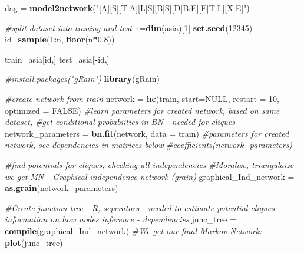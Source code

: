 \documentclass[]{article}
\newenvironment{Shaded}{\begin{snugshade}}{\end{snugshade}}
\newcommand{\CommentTok}[1]{\textcolor[rgb]{0.56,0.35,0.01}{\textit{#1}}}
\newcommand{\DataTypeTok}[1]{\textcolor[rgb]{0.13,0.29,0.53}{#1}}
\newcommand{\DecValTok}[1]{\textcolor[rgb]{0.00,0.00,0.81}{#1}}
\newcommand{\FloatTok}[1]{\textcolor[rgb]{0.00,0.00,0.81}{#1}}
\newcommand{\KeywordTok}[1]{\textcolor[rgb]{0.13,0.29,0.53}{\textbf{#1}}}
\newcommand{\NormalTok}[1]{#1}
\newcommand{\OperatorTok}[1]{\textcolor[rgb]{0.81,0.36,0.00}{\textbf{#1}}}
\newcommand{\OtherTok}[1]{\textcolor[rgb]{0.56,0.35,0.01}{#1}}
\newcommand{\StringTok}[1]{\textcolor[rgb]{0.31,0.60,0.02}{#1}}
\begin{document}
\begin{Shaded}
\begin{Highlighting}[]
\NormalTok{dag =}\StringTok{ }\KeywordTok{model2network}\NormalTok{(}\StringTok{"[A][S][T|A][L|S][B|S][D|B:E][E|T:L][X|E]"}\NormalTok{)}

\CommentTok{#split dataset into traning and test}
\NormalTok{n=}\KeywordTok{dim}\NormalTok{(asia)[}\DecValTok{1}\NormalTok{] }
\KeywordTok{set.seed}\NormalTok{(}\DecValTok{12345}\NormalTok{) }
\NormalTok{id=}\KeywordTok{sample}\NormalTok{(}\DecValTok{1}\OperatorTok{:}\NormalTok{n, }\KeywordTok{floor}\NormalTok{(n}\OperatorTok{*}\FloatTok{0.8}\NormalTok{)) }

\NormalTok{train=asia[id,]}
\NormalTok{test=asia[}\OperatorTok{-}\NormalTok{id,]}

\CommentTok{#install.packages("gRain")}
\KeywordTok{library}\NormalTok{(gRain)}

\CommentTok{#create network from train}
\NormalTok{network =}\StringTok{ }\KeywordTok{hc}\NormalTok{(train, }\DataTypeTok{start=}\OtherTok{NULL}\NormalTok{, }\DataTypeTok{restart =} \DecValTok{10}\NormalTok{, }\DataTypeTok{optimized =} \OtherTok{FALSE}\NormalTok{)}
\CommentTok{#learn parameters for created network, based on same dataset,}
\CommentTok{#get conditional probabiities in BN - needed for cliques}
\NormalTok{network_parameters =}\StringTok{ }\KeywordTok{bn.fit}\NormalTok{(network, }\DataTypeTok{data =}\NormalTok{ train)}
\CommentTok{#parameters for created network, see dependencies in matrices below}
\CommentTok{#coefficients(network_parameters)}

\CommentTok{#find potentials for cliques, checking all independencies }
\CommentTok{#Moralize, triangulaize - we get MN - Graphical independence network (grain)}
\NormalTok{graphical_Ind_network =}\StringTok{ }\KeywordTok{as.grain}\NormalTok{(network_parameters)}

\CommentTok{#Create junction tree - R, seperators - needed to estimate potential cliques - information on how nodes inference - dependencies }
\NormalTok{junc_tree =}\StringTok{ }\KeywordTok{compile}\NormalTok{(graphical_Ind_network)}
\CommentTok{#We get our final Markov Network:}
\KeywordTok{plot}\NormalTok{(junc_tree)}
\end{Highlighting}
\end{Shaded}
\end{document}
